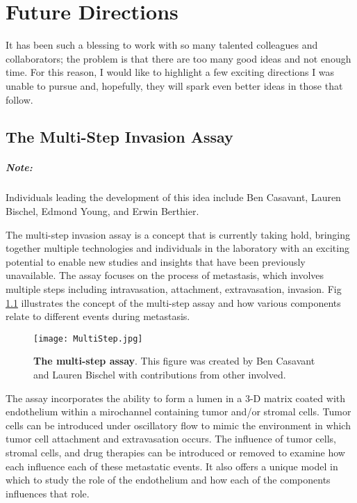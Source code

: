 \chapter{Future Directions}
It has been such a blessing to work with so many talented colleagues and collaborators; the problem is that there are too many good ideas and not enough time. For this reason, I would like to highlight a few exciting directions I was unable to pursue and, hopefully, they will spark even better ideas in those that follow.

\section{The Multi-Step Invasion Assay}
\paragraph{Note:}Individuals leading the development of this idea include Ben Casavant, Lauren Bischel, Edmond Young, and Erwin Berthier.

The multi-step invasion assay is a concept that is currently taking hold, bringing together multiple technologies and individuals in the laboratory with an exciting potential to enable new studies and insights that have been previously unavailable. The assay focuses on the process of metastasis, which involves multiple steps including intravasation, attachment, extravasation, invasion. Fig \ref{Chap:FutureDirections:fig:multiStep} illustrates the concept of the multi-step assay and how various components relate to different events during metastasis.

\begin{figure}[!ht]
\centering
\texttt{[image: MultiStep.jpg]}
\caption{\textbf{The multi-step assay}. This figure was created by Ben Casavant and Lauren Bischel with contributions from other involved.}
\label{Chap:FutureDirections:fig:multiStep}
\end{figure}

The assay incorporates the ability to form a lumen in a 3-D matrix coated with endothelium within a mirochannel containing tumor and\slash or stromal cells. Tumor cells can be introduced under oscillatory flow to mimic the environment in which tumor cell attachment and extravasation occurs. The influence of tumor cells, stromal cells, and drug therapies can be introduced or removed to examine how each influence each of these metastatic events. It also offers a unique model in which to study the role of the endothelium and how each of the components influences that role.

